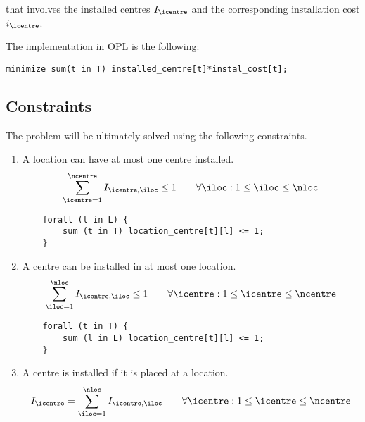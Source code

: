 that involves the installed centres $I_\icentre$ and the corresponding installation cost $i_\icentre$.

\hfill

The implementation in OPL is the following:

\begin{lstlisting}
minimize sum(t in T) installed_centre[t]*instal_cost[t];
\end{lstlisting}

\subsection{Constraints}

The problem will be ultimately solved using the following constraints.

\begin{enumerate}
\setcounter{enumi}{\value{equation}}

    \item A location can have at most one centre installed.
    \begin{equation}
    \sum_{\icentre = 1}^{\ncentre} I_{\icentre, \iloc} \le 1
    \qquad \forall \iloc: 1 \le \iloc \le \nloc
    \label{cstr:one-loc-one-centre-1}
    \end{equation}
    
    \begin{lstlisting}
    forall (l in L) {
    	sum (t in T) location_centre[t][l] <= 1;
    }
    \end{lstlisting}

    \item A centre can be installed in at most one location.
    \begin{equation}
    \sum_{\iloc = 1}^{\nloc} I_{\icentre, \iloc} \le 1
    \qquad \forall \icentre: 1 \le \icentre \le \ncentre
    \label{cstr:one-loc-one-centre-2}
    \end{equation}
    
    \begin{lstlisting}
    forall (t in T) {
    	sum (l in L) location_centre[t][l] <= 1;
    }
    \end{lstlisting}

    \item A centre is installed if it is placed at a location.
    \begin{equation}
    I_\icentre = \sum_{\iloc = 1}^{\nloc} I_{\icentre, \iloc}
    \qquad \forall \icentre: 1 \le \icentre \le \ncentre
    \label{cstr:is-centre-installed}
    \end{equation}
    

\end{enumerate}
